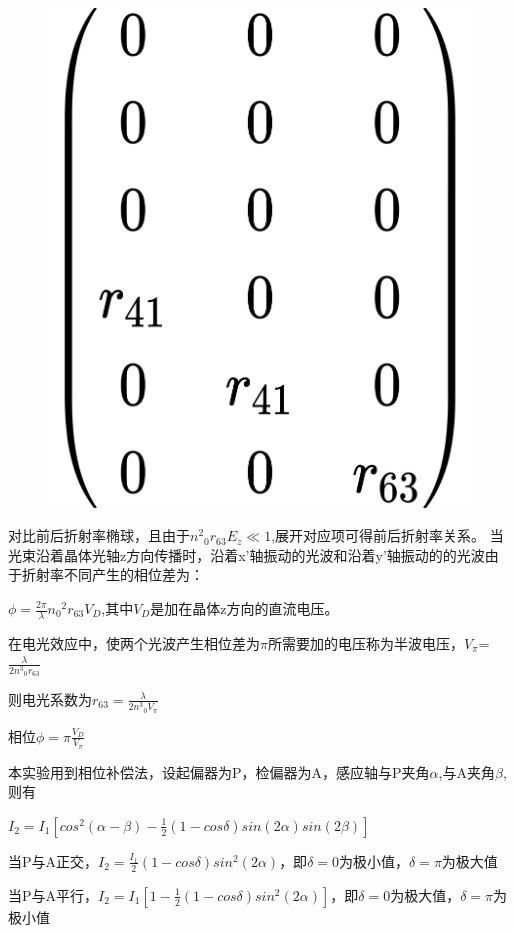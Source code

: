 \documentclass[font=default]{mpltx}
\begin{document}
\begin{figure}
  \centering
  \includegraphics[width=0.85\linewidth]{fig/matrix1.jpg}
  \label{fig:matrix1}
\end{figure}

对比前后折射率椭球，且由于${n^2}_0$$r_{63} E_z \ll 1$,展开对应项可得前后折射率关系。
当光束沿着晶体光轴z方向传播时，沿着x'轴振动的光波和沿着y'轴振动的的光波由于折射率不同产生的相位差为：

$\phi = \frac{2\pi}{\lambda}{n_0}^{2}r_{63}V_D$,其中$V_D$是加在晶体z方向的直流电压。

在电光效应中，使两个光波产生相位差为$\pi$所需要加的电压称为半波电压，$V_\pi$=$\frac{\lambda}{2{n^3}_0r_{63}}$

则电光系数为$r_{63} = \frac{\lambda}{2{n^3}_0V_\pi}$

相位$\phi = \pi \frac{V_D}{V_\pi}$


本实验用到相位补偿法，设起偏器为P，检偏器为A，感应轴与P夹角$\alpha$,与A夹角$\beta$,则有

$I_2 = I_1[cos^2 (\alpha - \beta) - \frac{1}{2} (1 - cos\delta)sin(2\alpha)sin(2\beta)]$

当P与A正交，$I_2 = \frac{I_1}{2} (1 - cos\delta)sin^2(2\alpha)$，即$\delta = 0$为极小值，$\delta = \pi$为极大值

当P与A平行，$I_2 = I_1[1 - \frac{1}{2} (1 - cos\delta)sin^2(2\alpha)]$，即$\delta = 0$为极大值，$\delta = \pi$为极小值
\end{document}
